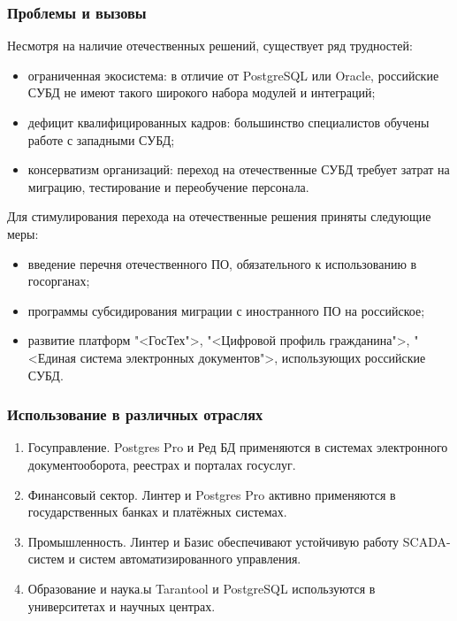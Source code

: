 \subsubsection{Проблемы и вызовы}

Несмотря на наличие отечественных решений, существует ряд трудностей:
\begin{itemize}
	\item ограниченная экосистема: в отличие от PostgreSQL или Oracle, российские СУБД не имеют такого широкого набора модулей и интеграций;
	\item дефицит квалифицированных кадров: большинство специалистов обучены работе с западными СУБД;
	\item консерватизм организаций: переход на отечественные СУБД требует затрат на миграцию, тестирование и переобучение персонала.
\end{itemize}

Для стимулирования перехода на отечественные решения приняты следующие меры:
\begin{itemize}
	\item введение перечня отечественного ПО, обязательного к использованию в госорганах;
	\item программы субсидирования миграции с иностранного ПО на российское;
	\item развитие платформ "<ГосТех">, "<Цифровой профиль гражданина">, "<Единая система электронных документов">, использующих российские СУБД.
\end{itemize}

\subsubsection{Использование в различных отраслях}

\begin{enumerate}
	\item Госуправление. Postgres Pro и Ред БД применяются в системах электронного документооборота, реестрах и порталах госуслуг.
	\item Финансовый сектор. Линтер и Postgres Pro активно применяются в государственных банках и платёжных системах.
	\item Промышленность. Линтер и Базис обеспечивают устойчивую работу SCADA-систем и систем автоматизированного управления.
	\item Образование и наука.ы Tarantool и PostgreSQL используются в университетах и научных центрах.
\end{enumerate}

